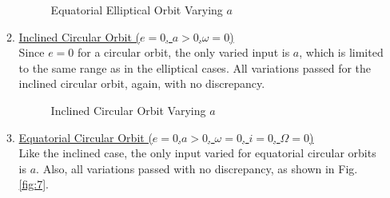\begin{itemize}
\begin{enumerate}
\begin{figure}[H]
			\caption{Equatorial Elliptical Orbit Varying $a$}
		\end{figure}
		\pagebreak
		\item \underline{Inclined Circular Orbit ($e=0$, \quad $a>0$,\quad $\omega=0$)}\\
		Since $e=0$ for a circular orbit, the only varied input is $a$, which is limited to the same range as in the elliptical cases. All variations passed for the inclined circular orbit, again, with no discrepancy.
		\begin{figure}[H] \label{fig:6}
			\centering
			\caption{Inclined Circular Orbit Varying $a$}
		\end{figure}
		\item \underline{Equatorial Circular Orbit ($e=0$,\quad $a>0$, \quad $\omega=0$, \quad $i=0$, \quad $\Omega=0$)}\\
		Like the inclined case, the only input varied for equatorial circular orbits is $a$. Also, all variations passed with no discrepancy, as shown in Fig. \ref{fig:7}.
		\begin{figure}[H]
			\centering

\end{figure}
\end{enumerate}
\end{itemize}
